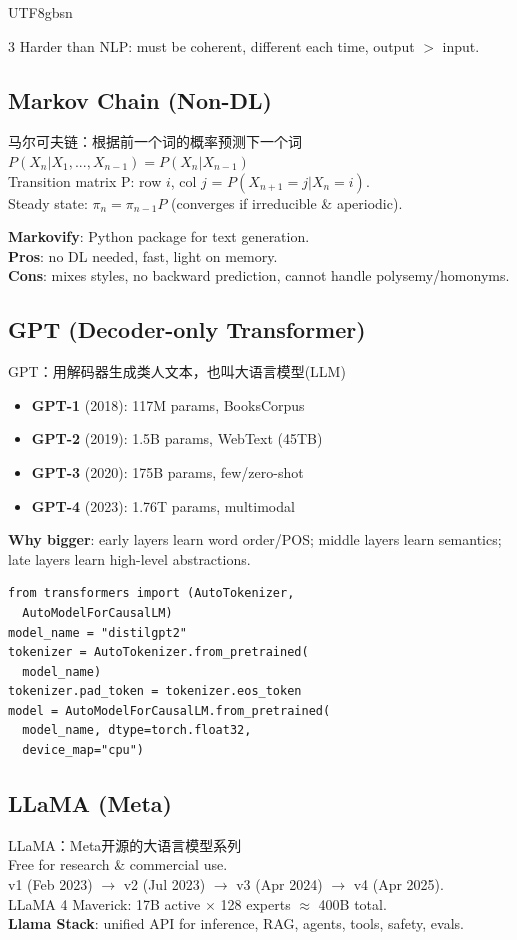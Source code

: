 \documentclass[9pt,landscape,a4paper]{article}
\newcommand{\zhint}[1]{{\scriptsize\color{gray!70!black}#1}}
\begin{document}
\begin{CJK}{UTF8}{gbsn}
\begin{multicols}{3}
Harder than NLP: must be coherent, different each time, output $>$ input.

\subsection{Markov Chain (Non-DL)}
\zhint{马尔可夫链：根据前一个词的概率预测下一个词}\\
$P(X_n|X_1,...,X_{n-1}) = P(X_n|X_{n-1})$\\
Transition matrix P: row $i$, col $j$ = $P(X_{n+1}=j|X_n=i)$.\\
Steady state: $\pi_n = \pi_{n-1} P$ (converges if irreducible \& aperiodic).

\textbf{Markovify}: Python package for text generation.\\
\textbf{Pros}: no DL needed, fast, light on memory.\\
\textbf{Cons}: mixes styles, no backward prediction, cannot handle polysemy/homonyms.

\subsection{GPT (Decoder-only Transformer)}
\zhint{GPT：用解码器生成类人文本，也叫大语言模型(LLM)}

\begin{itemize}[leftmargin=8pt,itemsep=0pt,topsep=0pt]
\item \textbf{GPT-1} (2018): 117M params, BooksCorpus
\item \textbf{GPT-2} (2019): 1.5B params, WebText (45TB)
\item \textbf{GPT-3} (2020): 175B params, few/zero-shot
\item \textbf{GPT-4} (2023): 1.76T params, multimodal
\end{itemize}

\textbf{Why bigger}: early layers learn word order/POS; middle layers learn semantics; late layers learn high-level abstractions.

\begin{lstlisting}
from transformers import (AutoTokenizer,
  AutoModelForCausalLM)
model_name = "distilgpt2"
tokenizer = AutoTokenizer.from_pretrained(
  model_name)
tokenizer.pad_token = tokenizer.eos_token
model = AutoModelForCausalLM.from_pretrained(
  model_name, dtype=torch.float32,
  device_map="cpu")
\end{lstlisting}

\subsection{LLaMA (Meta)}
\zhint{LLaMA：Meta开源的大语言模型系列}\\
Free for research \& commercial use.\\
v1 (Feb 2023) $\to$ v2 (Jul 2023) $\to$ v3 (Apr 2024) $\to$ v4 (Apr 2025).\\
LLaMA 4 Maverick: 17B active $\times$ 128 experts $\approx$ 400B total.\\
\textbf{Llama Stack}: unified API for inference, RAG, agents, tools, safety, evals.


\end{multicols}
\end{CJK}
\end{document}
